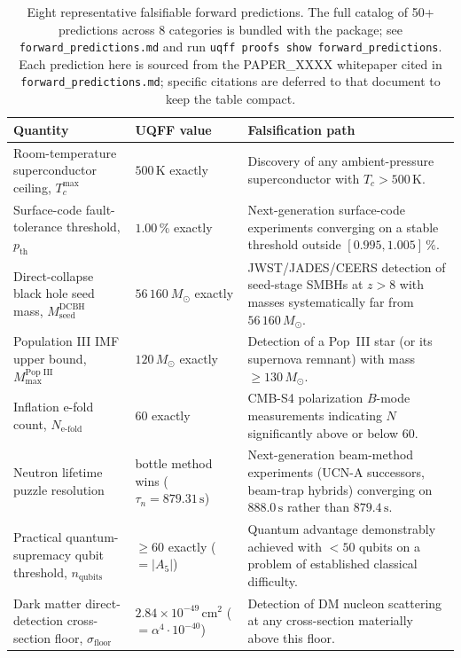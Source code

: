 \begin{table}[H]
\centering
\caption{Eight representative falsifiable forward predictions. The full
catalog of 50+ predictions across 8 categories is bundled with the
package; see \texttt{forward\_predictions.md} and run
\texttt{uqff proofs show forward\_predictions}. Each prediction here is
sourced from the PAPER\_XXXX whitepaper cited in
\texttt{forward\_predictions.md}; specific citations are deferred to
that document to keep the table compact.}
\label{tab:top_forecasts}
\begin{tabular}{p{4.0cm} l p{6.0cm}}
\toprule
\textbf{Quantity} & \textbf{UQFF value} & \textbf{Falsification path} \\
\midrule
Room-temperature superconductor ceiling, $T_c^{\max}$ &
$500\,\mathrm{K}$ exactly &
Discovery of any ambient-pressure superconductor with $T_c > 500\,\mathrm{K}$. \\

Surface-code fault-tolerance threshold, $p_{\text{th}}$ &
$1.00\,\%$ exactly &
Next-generation surface-code experiments converging on a stable threshold outside $[0.995, 1.005]\,\%$. \\

Direct-collapse black hole seed mass, $M_{\text{seed}}^{\text{DCBH}}$ &
$56\,160\ M_\odot$ exactly &
JWST/JADES/CEERS detection of seed-stage SMBHs at $z>8$ with masses systematically far from $56\,160\,M_\odot$. \\

Population III IMF upper bound, $M^{\text{Pop III}}_{\max}$ &
$120\,M_\odot$ exactly &
Detection of a Pop~III star (or its supernova remnant) with mass $\geq 130\,M_\odot$. \\

Inflation e-fold count, $N_{\text{e-fold}}$ &
$60$ exactly &
CMB-S4 polarization $B$-mode measurements indicating $N$ significantly above or below 60. \\

Neutron lifetime puzzle resolution &
bottle method wins ($\tau_n = 879.31\,\mathrm{s}$) &
Next-generation beam-method experiments (UCN-A successors, beam-trap hybrids) converging on $888.0\,\mathrm{s}$ rather than $879.4\,\mathrm{s}$. \\

Practical quantum-supremacy qubit threshold, $n_{\text{qubits}}$ &
$\geq 60$ exactly ($= |A_5|$) &
Quantum advantage demonstrably achieved with $<50$ qubits on a problem of established classical difficulty. \\

Dark matter direct-detection cross-section floor, $\sigma_{\text{floor}}$ &
$2.84\times 10^{-49}\,\mathrm{cm^2}$ ($=\alpha^4\cdot 10^{-40}$) &
Detection of DM nucleon scattering at any cross-section materially above this floor. \\
\bottomrule
\end{tabular}
\end{table}

